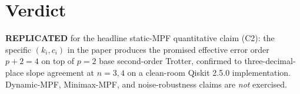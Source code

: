 \documentclass[11pt]{article}
\begin{document}
\section{Verdict}
\textbf{REPLICATED} for the headline static-MPF quantitative claim (C2): the specific
$(k_i, c_i)$ in the paper produces the promised effective error order $p+2 = 4$ on top of
$p=2$ base second-order Trotter, confirmed to three-decimal-place slope agreement at $n=3,4$
on a clean-room Qiskit 2.5.0 implementation. Dynamic-MPF, Minimax-MPF, and noise-robustness
claims are \emph{not} exercised.
\end{document}
